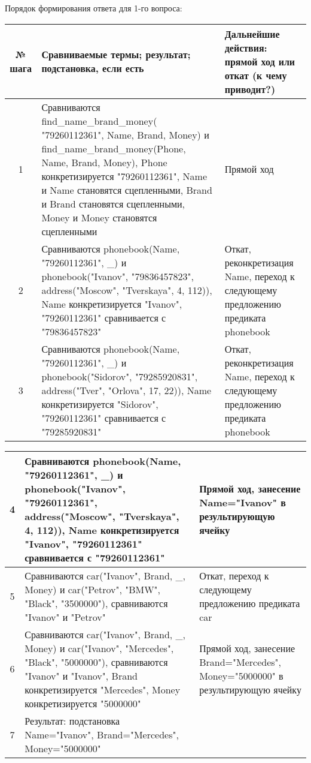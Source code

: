 \documentclass[a4paper,12pt]{article}
\begin{document}
	Порядок формирования ответа для 1-го вопроса:
	\begin{table}[ht!] 
		\begin{tabularx}{\linewidth}{|c|>{\centering}X|>{\centering}X|}
			\hline
			№ шага & Сравниваемые термы; результат; подстановка, если есть & Дальнейшие действия: прямой ход или откат (к чему приводит?)\tabularnewline
			\hline
			1 & Сравниваются find\_name\_brand\_money( "79260112361"{}, Name, Brand, Money) и find\_name\_brand\_money(Phone, Name, Brand, Money), Phone конкретизируется "79260112361"{}, Name и Name становятся сцепленными, Brand и Brand становятся сцепленными, Money и Money становятся сцепленными & Прямой ход \tabularnewline
			\hline
			2 & Сравниваются phonebook(Name, "79260112361"{}, \_) и phonebook("Ivanov"{}, "79836457823"{}, address("Moscow"{}, "Tverskaya"{}, 4, 112)), Name конкретизируется "Ivanov"{}, "79260112361" сравнивается с "79836457823" & Откат, реконкретизация Name, переход к следующему предложению предиката phonebook \tabularnewline
			\hline
			3 & Сравниваются phonebook(Name, "79260112361"{}, \_) и phonebook("Sidorov"{}, "79285920831"{}, address("Tver"{}, "Orlova"{}, 17, 22)), Name конкретизируется "Sidorov"{}, "79260112361" сравнивается с "79285920831" & Откат, реконкретизация Name, переход к следующему предложению предиката phonebook \tabularnewline
			\hline
		\end{tabularx}
	\end{table}
	\newpage
	\begin{table}[ht!] 
		\begin{tabularx}{\linewidth}{|c|>{\centering}X|>{\centering}X|}
			\hline
			4 & Сравниваются phonebook(Name, "79260112361"{}, \_) и phonebook("Ivanov"{}, "79260112361"{}, address("Moscow"{}, "Tverskaya"{}, 4, 112)), Name конкретизируется "Ivanov"{}, "79260112361" сравнивается с "79260112361" & Прямой ход, занесение Name="Ivanov" в результирующую ячейку \tabularnewline
			\hline
			5 & Сравниваются car("Ivanov"{}, Brand, \_, Money) и car("Petrov"{}, "BMW"{}, "Black"{}, "3500000"), сравниваются "Ivanov" и "Petrov" & Откат, переход к следующему предложению предиката car \tabularnewline
			\hline
			6 & Сравниваются car("Ivanov"{}, Brand, \_, Money) и car("Ivanov"{}, "Mercedes"{}, "Black"{}, "5000000"), сравниваются "Ivanov" и "Ivanov"{}, Brand конкретизируется "Mercedes"{}, Money конкретизируется "5000000" & Прямой ход, занесение Brand="Mercedes"{}, Money="5000000" в результирующую ячейку \tabularnewline
			\hline
			7 & Результат: подстановка Name="Ivanov"{}, Brand="Mercedes"{}, Money="5000000" &  \tabularnewline
			\hline
		\end{tabularx}
	\end{table}	
	
\end{document}
